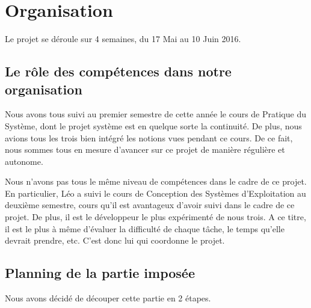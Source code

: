 \documentclass[a4paper, 11pt, titlepage]{article}
\begin{document}
\section{Organisation}
Le projet se déroule sur 4 semaines, du 17 Mai au 10 Juin 2016.

\subsection{Le rôle des compétences dans notre organisation}
Nous avons tous suivi au premier semestre  de cette année le cours de Pratique du Système, dont le projet système est en quelque sorte la continuité. De plus, nous avions tous les trois bien intégré les notions vues pendant ce cours. De ce fait, nous sommes tous en mesure d'avancer sur ce projet de manière régulière et autonome.

Nous n'avons pas tous le même niveau de compétences dans le cadre de ce projet. En particulier, Léo a suivi le cours de Conception des Systèmes d'Exploitation au deuxième semestre, cours qu'il est avantageux d'avoir suivi dans le cadre de ce projet. De plus, il est le développeur le plus expérimenté de nous trois. A ce titre, il est le plus à même d'évaluer la difficulté de chaque tâche, le temps qu'elle devrait prendre, etc. C'est donc lui qui coordonne le projet.

\subsection{Planning de la partie imposée}
Nous avons décidé de découper cette partie en 2 étapes.
\end{document}
